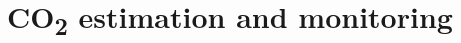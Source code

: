 \chapter{CO\textsubscript{2} estimation and monitoring}

\renewcommand{\headrulewidth}{0pt}
\lhead[\thepage]{\rightmark}
\rhead[\rightmark]{\thepage}
\cfoot[]{}


